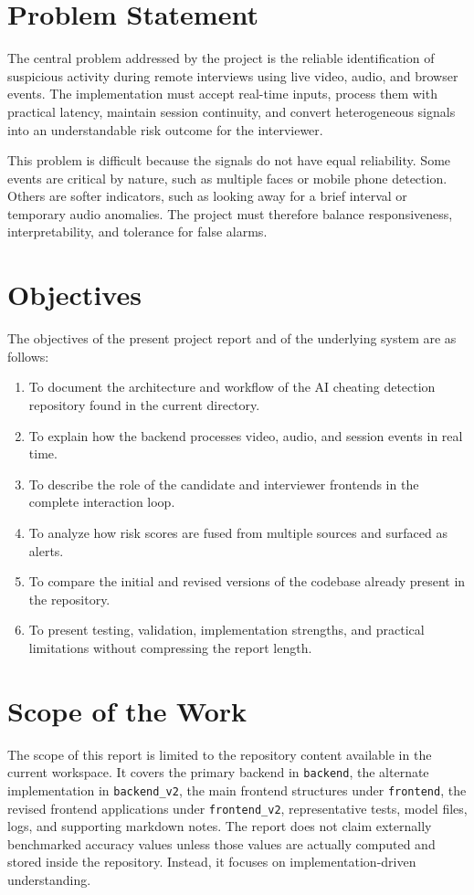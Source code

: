 \documentclass[12pt,a4paper]{extreport}
\begin{document}
\section{Problem Statement}
The central problem addressed by the project is the reliable identification of suspicious activity during remote interviews using live video, audio, and browser events. The implementation must accept real-time inputs, process them with practical latency, maintain session continuity, and convert heterogeneous signals into an understandable risk outcome for the interviewer.

This problem is difficult because the signals do not have equal reliability. Some events are critical by nature, such as multiple faces or mobile phone detection. Others are softer indicators, such as looking away for a brief interval or temporary audio anomalies. The project must therefore balance responsiveness, interpretability, and tolerance for false alarms.

\section{Objectives}
The objectives of the present project report and of the underlying system are as follows:
\begin{enumerate}
  \item To document the architecture and workflow of the AI cheating detection repository found in the current directory.
  \item To explain how the backend processes video, audio, and session events in real time.
  \item To describe the role of the candidate and interviewer frontends in the complete interaction loop.
  \item To analyze how risk scores are fused from multiple sources and surfaced as alerts.
  \item To compare the initial and revised versions of the codebase already present in the repository.
  \item To present testing, validation, implementation strengths, and practical limitations without compressing the report length.
\end{enumerate}

\section{Scope of the Work}
The scope of this report is limited to the repository content available in the current workspace. It covers the primary backend in \texttt{backend}, the alternate implementation in \texttt{backend\_v2}, the main frontend structures under \texttt{frontend}, the revised frontend applications under \texttt{frontend\_v2}, representative tests, model files, logs, and supporting markdown notes. The report does not claim externally benchmarked accuracy values unless those values are actually computed and stored inside the repository. Instead, it focuses on implementation-driven understanding.
\end{document}
